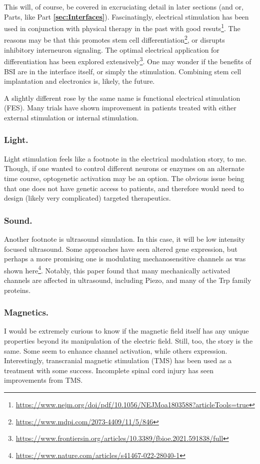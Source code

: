 This will, of course, be covered in excruciating detail in later sections (and or, Parts, like Part \textbf{\ref{sec:Interfaces}}). Fascinatingly, electrical stimulation has been used in conjunction with physical therapy in the past with good resuts\footnote{\url{https://www.nejm.org/doi/pdf/10.1056/NEJMoa1803588?articleTools=true}}. The reasons may be that this promotes stem cell differentiation\footnote{\url{https://www.mdpi.com/2073-4409/11/5/846}}, or disrupts inhibitory interneuron signaling. The optimal electrical application for differentiation has been explored extensively\footnote{\url{https://www.frontiersin.org/articles/10.3389/fbioe.2021.591838/full}}. One may wonder if the benefits of BSI are in the interface itself, or simply the stimulation. Combining stem cell implantation and electronics is, likely, the future.\newline

A slightly different rose by the same name is functional electrical stimulation (FES). Many trials have shown improvement in patients treated with either external stimulation or internal stimulation. 

\subsubsection{Light.}
Light stimulation feels like a footnote in the electrical modulation story, to me. Though, if one wanted to control different neurons or enzymes on an alternate time course, optogenetic activation may be an option. The obvious issue being that one does not have genetic access to patients, and therefore would need to design (likely very complicated) targeted therapeutics. 

\subsubsection{Sound.}
Another footnote is ultrasound simulation. In this case, it will be low intensity focused ultrasound. Some approaches have seen altered gene expression, but perhaps a more promising one is modulating mechanosensitive channels as was shown here\footnote{\url{https://www.nature.com/articles/s41467-022-28040-1}}. Notably, this paper found that many mechanically activated channels are affected in ultrasound, including Piezo, and many of the Trp family proteins. 

\subsubsection{Magnetics.}
I would be extremely curious to know if the magnetic field itself has any unique properties beyond its manipulation of the electric field. Still, too, the story is the same. Some seem to enhance channel activation, while others expression. Interestingly, transcranial magnetic stimulation (TMS) has been used as a treatment with some success. Incomplete spinal cord injury has seen improvements from TMS. 


